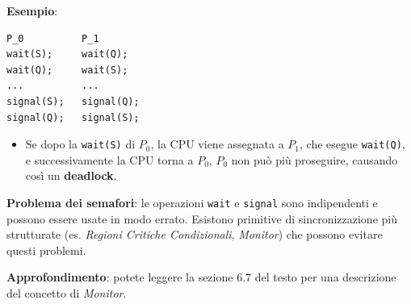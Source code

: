 \textbf{Esempio}:
\begin{verbatim}
P_0          P_1
wait(S);     wait(Q);
wait(Q);     wait(S);
...          ...
signal(S);   signal(Q);
signal(Q);   signal(S);
\end{verbatim}

\begin{itemize}
    \item Se dopo la \texttt{wait(S)} di \( P_0 \), la CPU viene assegnata a \( P_1 \), che esegue \texttt{wait(Q)}, e successivamente la CPU torna a \( P_0 \), \( P_0 \) non può più proseguire, causando così un \textbf{deadlock}.
\end{itemize}

\textbf{Problema dei semafori}: le operazioni \texttt{wait} e \texttt{signal} sono indipendenti e possono essere usate in modo errato. Esistono primitive di sincronizzazione più strutturate (es. \textit{Regioni Critiche Condizionali}, \textit{Monitor}) che possono evitare questi problemi.

\textbf{Approfondimento}: potete leggere la sezione 6.7 del testo per una descrizione del concetto di \textit{Monitor}.